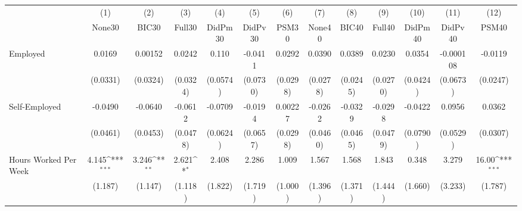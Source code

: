{
\def\sym#1{\ifmmode^{#1}\else\(^{#1}\)\fi}
\begin{tabular}{l*{12}{c}}
\toprule
            &\multicolumn{1}{c}{(1)}&\multicolumn{1}{c}{(2)}&\multicolumn{1}{c}{(3)}&\multicolumn{1}{c}{(4)}&\multicolumn{1}{c}{(5)}&\multicolumn{1}{c}{(6)}&\multicolumn{1}{c}{(7)}&\multicolumn{1}{c}{(8)}&\multicolumn{1}{c}{(9)}&\multicolumn{1}{c}{(10)}&\multicolumn{1}{c}{(11)}&\multicolumn{1}{c}{(12)}\\
            &\multicolumn{1}{c}{None30}&\multicolumn{1}{c}{BIC30}&\multicolumn{1}{c}{Full30}&\multicolumn{1}{c}{DidPm30}&\multicolumn{1}{c}{DidPv30}&\multicolumn{1}{c}{PSM30}&\multicolumn{1}{c}{None40}&\multicolumn{1}{c}{BIC40}&\multicolumn{1}{c}{Full40}&\multicolumn{1}{c}{DidPm40}&\multicolumn{1}{c}{DidPv40}&\multicolumn{1}{c}{PSM40}\\
\midrule
Employed    &      0.0169         &     0.00152         &      0.0242         &       0.110         &     -0.0411         &      0.0292         &      0.0390         &      0.0389         &      0.0230         &      0.0354         &   -0.000108         &     -0.0119         \\
            &    (0.0331)         &    (0.0324)         &    (0.0324)         &    (0.0574)         &    (0.0730)         &    (0.0298)         &    (0.0278)         &    (0.0245)         &    (0.0270)         &    (0.0424)         &    (0.0673)         &    (0.0247)         \\
\addlinespace
Self-Employed&     -0.0490         &     -0.0640         &     -0.0612         &     -0.0709         &     -0.0194         &     0.00227         &     -0.0262         &     -0.0329         &     -0.0298         &     -0.0422         &      0.0956         &      0.0362         \\
            &    (0.0461)         &    (0.0453)         &    (0.0478)         &    (0.0624)         &    (0.0657)         &    (0.0298)         &    (0.0460)         &    (0.0465)         &    (0.0479)         &    (0.0790)         &    (0.0529)         &    (0.0307)         \\
\addlinespace
Hours Worked Per Week&       4.145\sym{***}&       3.246\sym{**} &       2.621\sym{*}  &       2.408         &       2.286         &       1.009         &       1.567         &       1.568         &       1.843         &       0.348         &       3.279         &       16.00\sym{***}\\
            &     (1.187)         &     (1.147)         &     (1.118)         &     (1.822)         &     (1.719)         &     (1.000)         &     (1.396)         &     (1.371)         &     (1.444)         &     (1.660)         &     (3.233)         &     (1.787)         \\

\end{tabular}}
